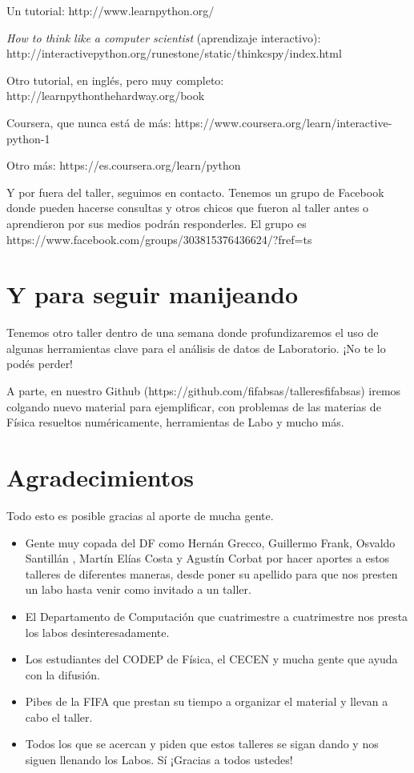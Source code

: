 \documentclass[11pt]{article}
\providecommand{\tightlist}{%
      \setlength{\itemsep}{0pt}\setlength{\parskip}{0pt}}
\begin{document}
Un tutorial: http://www.learnpython.org/

\emph{How to think like a computer scientist} (aprendizaje interactivo):
http://interactivepython.org/runestone/static/thinkcspy/index.html

Otro tutorial, en inglés, pero muy completo:
http://learnpythonthehardway.org/book

Coursera, que nunca está de más:
https://www.coursera.org/learn/interactive-python-1

Otro más: https://es.coursera.org/learn/python

Y por fuera del taller, seguimos en contacto. Tenemos un grupo de
Facebook donde pueden hacerse consultas y otros chicos que fueron al
taller antes o aprendieron por sus medios podrán responderles. El grupo
es https://www.facebook.com/groups/303815376436624/?fref=ts

    \section{Y para seguir manijeando}\label{y-para-seguir-manijeando}

Tenemos otro taller dentro de una semana donde profundizaremos el uso de
algunas herramientas clave para el análisis de datos de Laboratorio. ¡No
te lo podés perder!

A parte, en nuestro Github
(https://github.com/fifabsas/talleresfifabsas) iremos colgando nuevo
material para ejemplificar, con problemas de las materias de Física
resueltos numéricamente, herramientas de Labo y mucho más.

    \section{Agradecimientos}\label{agradecimientos}

Todo esto es posible gracias al aporte de mucha gente.

\begin{itemize}
\tightlist
\item
  Gente muy copada del DF como Hernán Grecco, Guillermo Frank, Osvaldo
  Santillán , Martín Elías Costa y Agustín Corbat por hacer aportes a
  estos talleres de diferentes maneras, desde poner su apellido para que
  nos presten un labo hasta venir como invitado a un taller.
\item
  El Departamento de Computación que cuatrimestre a cuatrimestre nos
  presta los labos desinteresadamente.
\item
  Los estudiantes del CODEP de Física, el CECEN y mucha gente que ayuda
  con la difusión.
\item
  Pibes de la FIFA que prestan su tiempo a organizar el material y
  llevan a cabo el taller.
\item
  Todos los que se acercan y piden que estos talleres se sigan dando y
  nos siguen llenando los Labos. Sí ¡Gracias a todos ustedes!
\end{itemize}


    
    
    
    
\end{document}
